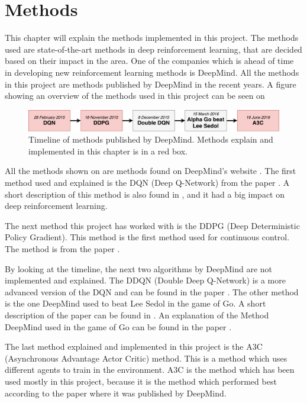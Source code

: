 \chapter{Methods}
\label{chap:projectdef}
This chapter will explain the methods implemented in this project. The methods used are state-of-the-art methods in deep reinforcement learning, that are decided based on their impact in the area. One of the companies which is ahead of time in developing new reinforcement learning methods is DeepMind. All the methods in this project are methods published by DeepMind in the recent years. A figure showing an overview of the methods used in this project can be seen on      

\begin{figure}[H]
	\centering
	\includegraphics[width=1.25\textwidth]{Figures/Architecture/Methods_deepmind.pdf}
	\caption{Timeline of methods published by DeepMind. Methods explain and implemented in this chapter is in a red box.   }
	\label{fig:Methods_deepmind}
\end{figure}

All the methods shown on  are methods found on DeepMind's website \cite{Publications_Deepmind}. The first method used and explained is the DQN (Deep Q-Network) from the paper \cite{DBLP:journals/corr/MnihKSGAWR13}. A short description of this method is also found in , and it had a big impact on deep reinforcement learning.

The next method this project has worked with is the DDPG (Deep Deterministic Policy Gradient). This method is the first method used for continuous control. The method is from the paper \cite{DBLP:journals/corr/LillicrapHPHETS15}. 

By looking at the timeline, the next two algorithms by DeepMind are not implemented and explained. The DDQN (Double Deep Q-Network) is a more advanced version of the DQN and can be found in the paper \cite{DBLP:journals/corr/HasseltGS15}. The other method is the one DeepMind used to beat Lee Sedol in the game of Go. A short description of the paper can be found in . An explanation of the Method DeepMind used in the game of Go can be found in the paper \cite{Silver_2016}. 

The last method explained and implemented in this project is the A3C (Asynchronous Advantage Actor Critic) method. This is a method which uses different agents to train in the environment. A3C is the method which has been used mostly in this project, because it is the method which performed best according to the paper \cite{DBLP:journals/corr/MnihBMGLHSK16} where it was published by DeepMind.

